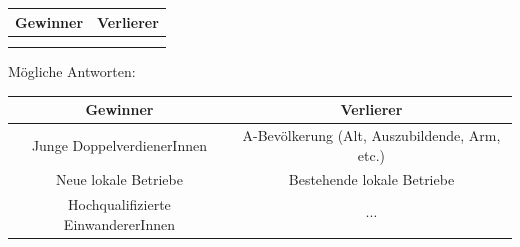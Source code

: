 \begin{questions}
	
	\begin{table}[H]
	\centering
	\begin{tabular}{p{.4\linewidth}|p{.4\linewidth}}
	\textbf{Gewinner}& \textbf{Verlierer}\\\midrule
	&\\[60pt]
	&\\[60pt]
	\end{tabular}
	\end{table}
	\begin{solution}
	Mögliche Antworten:
		\begin{table}[H]
		\centering
		\begin{tabular}{c|c}
		\textbf{Gewinner}& \textbf{Verlierer}\\\midrule\midrule
		Junge DoppelverdienerInnen&A-Bevölkerung (Alt, Auszubildende, Arm, etc.)\\\midrule
		Neue lokale Betriebe& Bestehende lokale Betriebe\\\midrule
		Hochqualifizierte EinwandererInnen & $\cdots$ \\
		\end{tabular}
		\end{table}\end{solution}
	\droptotalpoints
	\clearpage

\end{questions}

